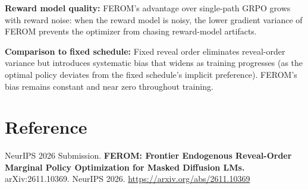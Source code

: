 \documentclass[10pt,twocolumn]{article}
\begin{document}
\textbf{Reward model quality:} FEROM's advantage over single-path GRPO grows
with reward noise: when the reward model is noisy, the lower gradient variance
of FEROM prevents the optimizer from chasing reward-model artifacts.

\textbf{Comparison to fixed schedule:} Fixed reveal order eliminates reveal-order
variance but introduces systematic bias that widens as training progresses
(as the optimal policy deviates from the fixed schedule's implicit preference).
FEROM's bias remains constant and near zero throughout training.

\section*{Reference}

NeurIPS 2026 Submission.
\textbf{FEROM: Frontier Endogenous Reveal-Order Marginal Policy Optimization
for Masked Diffusion LMs.}
arXiv:2611.10369. NeurIPS 2026.
\url{https://arxiv.org/abs/2611.10369}
\end{document}
